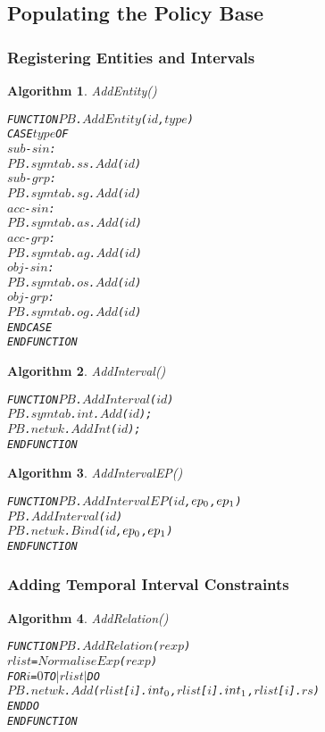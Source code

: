 \documentclass[11pt]{report}
\newenvironment{vverbatim}
{
  \begin{alltt}
}
{
    \vspace{-\baselineskip}
  \end{alltt}
}
\newtheorem{vvalgorithm}{Algorithm}[chapter]
\newenvironment{valgorithm}[2]
{
  \begin{vvalgorithm}{#1}
    \label{#2}
    \small
    \begin{vverbatim}
}
{
    \end{vverbatim}
  \end{vvalgorithm}
}
\begin{document}
      \subsection{Populating the Policy Base}

        \subsubsection{Registering Entities and Intervals}

          \begin{valgorithm}{AddEntity()}{algo-impln-adent}
FUNCTION \(PB\).\(AddEntity\)(\(id\), \(type\))
  CASE \(type\) OF
    \(sub\)-\(sin\) :
      \(PB\).\(symtab\).\(ss\).\(Add\)(\(id\))
    \(sub\)-\(grp\) :
      \(PB\).\(symtab\).\(sg\).\(Add\)(\(id\))
    \(acc\)-\(sin\) :
      \(PB\).\(symtab\).\(as\).\(Add\)(\(id\))
    \(acc\)-\(grp\) :
      \(PB\).\(symtab\).\(ag\).\(Add\)(\(id\))
    \(obj\)-\(sin\) :
      \(PB\).\(symtab\).\(os\).\(Add\)(\(id\))
    \(obj\)-\(grp\) :
      \(PB\).\(symtab\).\(og\).\(Add\)(\(id\))
  ENDCASE
ENDFUNCTION
          \end{valgorithm}

          \begin{valgorithm}{AddInterval()}{algo-impln-adint}
FUNCTION \(PB\).\(AddInterval\)(\(id\))
  \(PB\).\(symtab\).\(int\).\(Add\)(\(id\));
  \(PB\).\(netwk\).\(AddInt\)(\(id\));
ENDFUNCTION
          \end{valgorithm}

          \begin{valgorithm}{AddIntervalEP()}{algo-impln-adine}
FUNCTION \(PB\).\(AddIntervalEP\)(\(id\), \(ep\sb{0}\), \(ep\sb{1}\))
  \(PB\).\(AddInterval\)(\(id\))
  \(PB\).\(netwk\).\(Bind\)(\(id\), \(ep\sb{0}\), \(ep\sb{1}\))
ENDFUNCTION
          \end{valgorithm}

        \subsubsection{Adding Temporal Interval Constraints}

          \begin{valgorithm}{AddRelation()}{algo-impln-adrel}
FUNCTION \(PB\).\(AddRelation\)(\(rexp\))
  \(rlist\) = \(NormaliseExp\)(\(rexp\))
  FOR \(i\) = \(0\) TO \(|rlist|\) DO
    \(PB\).\(netwk\).\(Add\)(\(rlist\)[\(i\)].\(int\sb{0}\), \(rlist\)[\(i\)].\(int\sb{1}\), \(rlist\)[\(i\)].\(rs\))
  ENDDO
ENDFUNCTION
          \end{valgorithm}
\end{document}
